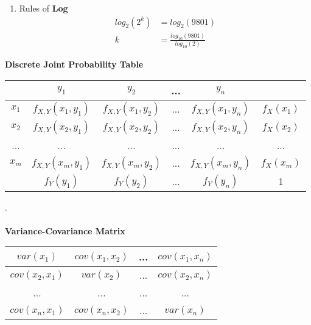 \documentclass{article}
\begin{document}
\begin{small}
\begin{multicols}{2}
\begin{enumerate}
  \item Rules of \textbf{Log} 
  \begin{align*}
  log_2(2^k) & = log_2(9801) \\
          k  & = \frac{log_{10}(9801)}{log_{10}(2)}
  \end{align*}
  
\end{enumerate}

\textbf{Discrete Joint Probability Table}\\
\begin{tabular}{ |c|c|c|c|c|c| }
\hline
& $y_1$ & $y_2$ & ... & $y_n$ & \\
\hline
$x_1$ & $f_{X,Y}(x_1, y_1)$ &  $f_{X,Y}(x_1, y_2)$ & ... & $f_{X,Y}(x_1, y_n)$ & $f_X(x_1)$\\
\hline
$x_2$ & $f_{X,Y}(x_2, y_1)$ &  $f_{X,Y}(x_2, y_2)$ & ... & $f_{X,Y}(x_2, y_n)$ & $f_X(x_2)$\\
\hline
...   & ...                 &  ...                 & ... & ...                 & ... \\
\hline
$x_m$ & $f_{X,Y}(x_m, y_1)$ &  $f_{X,Y}(x_m, y_2)$ & ... & $f_{X,Y}(x_m, y_n)$ & $f_X(x_m)$\\
\hline
      & $f_Y(y_1)$    &  $f_Y(y_2)$    & ... & $f_Y(y_n)$    & 1\\
\hline
\end{tabular}
.\\\\
\textbf{Variance-Covariance Matrix}\\
\begin{tabular}{ |c|c|c|c| }
\hline
$var(x_1) $ & $cov(x_1, x_2)$ & ... & $cov(x_1, x_n)$  \\
\hline
$cov(x_2, x_1)$ & $var(x_2) $ & ... & $cov(x_2, x_n)$\\
\hline
...            & ...                       &  ... & ... \\
\hline
$cov(x_n, x_1)$ & $cov(x_n, x_2)$ & ... & $var(x_n) $\\
\hline
\end{tabular}

\end{multicols}

\pagebreak



\end{small}
\end{document}
